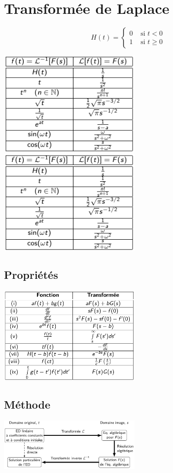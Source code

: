 \documentclass[resume]{subfiles}
\begin{document}
\section{Transformée de Laplace}
$$H(t)=\begin{cases}0 & \text{ si } t<0\\ 1 & \text{ si } t \geq 0\end{cases}$$
\begin{center}
\includegraphics[width=7cm,page=1]{img_6.pdf}\\
\includegraphics[width=7cm,page=2]{img_6.pdf}
\end{center}
\subsection{Propriétés}
\begin{center}
\includegraphics[width=7cm]{drwg_0.pdf}
\end{center}
\subsection{Méthode}
\begin{center}
\includegraphics[width=7cm]{img_7.pdf}
\end{center}
\end{document}
